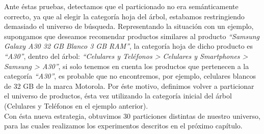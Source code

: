 Ante \'estas pruebas, detectamos que el particionado no era sem\'anticamente correcto, ya que al elegir la categor\'ia hoja del \'arbol, estabamos restringiendo demasiado el universo de b\'usqueda. Representando la situaci\'on con un ejemplo, supongamos que deseamos recomendar productos similares al producto \textit{“Samsung Galaxy A30 32 GB Blanco 3 GB RAM”}, la categor\'ia hoja de dicho producto es \textit{“A30”}, dentro del \'arbol: \textit{“Celulares y Tel\'efonos > Celulares y Smartphones > Samsung > A30”}, si solo tenemos en cuenta los productos que pertenecen a la categor\'ia \textit{“A30”}, es probable que no encontremos, por ejemplo, celulares blancos de 32 GB de la marca Motorola.
Por \'este motivo, definimos volver a particionar el universo de productos, \'esta vez utilizando la categor\'ia inicial del \'arbol (Celulares y Tel\'efonos en el ejemplo anterior).\\

Con \'esta nueva estrategia, obtuvimos 30 particiones distintas de nuestro universo, para las cuales realizamos los experimentos descritos en el pr\'oximo cap\'itulo.
